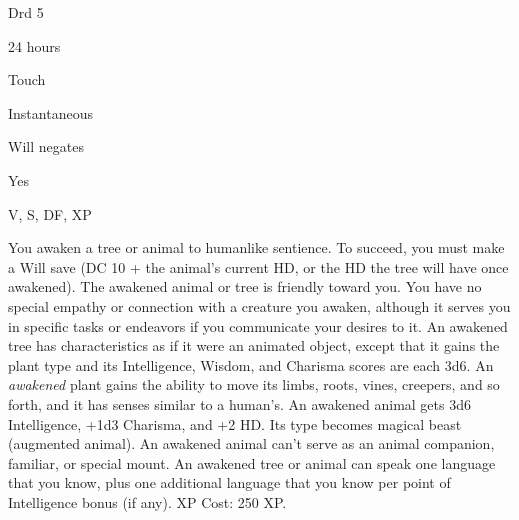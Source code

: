 
\begin{description*}
\item[Level:] Drd 5
\item[Casting Time:] 24 hours
\item[Range:] Touch
\item[Duration:] Instantaneous
\item[Saving Throw:] Will negates
\item[Spell Resistance:] Yes
\item[Components:] V, S, DF, XP
\end{description*}

You awaken a tree or animal to humanlike sentience. To succeed, you must make a
Will save (DC 10 + the animal's current HD, or the HD the tree will have once awakened).
The awakened animal or tree is friendly toward you. You have no special
empathy or connection with a creature you awaken, although it serves you in specific
tasks or endeavors if you communicate your desires to it.
An awakened tree has characteristics as if it were an animated object,
except that it gains the plant type and its Intelligence, Wisdom, and Charisma
scores are each 3d6. An \textit{awakened} plant gains the ability to move its limbs,
roots, vines, creepers, and so forth, and it has senses similar to a human's.
An awakened animal gets 3d6 Intelligence, +1d3 Charisma, and +2 HD. Its
type becomes magical beast (augmented animal). An awakened animal can't serve as
an animal companion, familiar, or special mount.
An awakened tree or animal can speak one language that you know, plus
one additional language that you know per point of Intelligence bonus (if any).
XP Cost: 250 XP.
